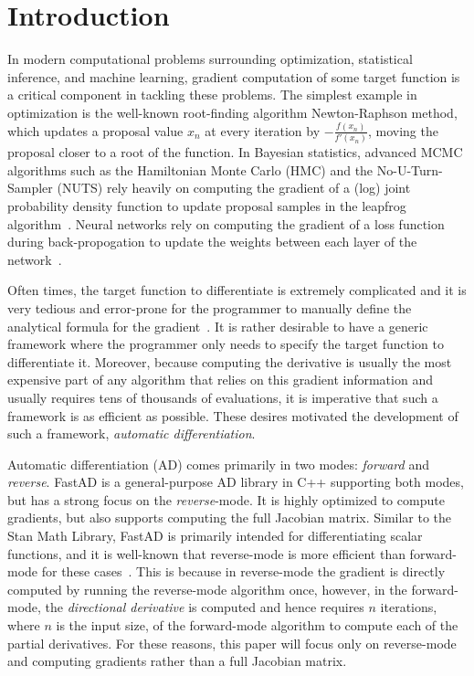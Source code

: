 \section{Introduction}

In modern computational problems surrounding optimization, statistical inference, and machine learning,
gradient computation of some target function is a critical component in tackling these problems.
The simplest example in optimization is the well-known root-finding algorithm Newton-Raphson method,
which updates a proposal value $x_n$ at every iteration by $-\frac{f(x_n)}{f'(x_n)}$,
moving the proposal closer to a root of the function.
In Bayesian statistics, advanced MCMC algorithms
such as the Hamiltonian Monte Carlo (HMC) and the No-U-Turn-Sampler (NUTS) rely
heavily on computing the gradient of a (log) joint probability density function
to update proposal samples in the leapfrog algorithm~\cite{hoffman:2011}\cite{neal:2012}.
Neural networks rely on computing 
the gradient of a loss function during back-propogation
to update the weights between each layer of the network~\cite{goodfellow:2016}.

Often times, the target function to differentiate is extremely complicated
and it is very tedious and error-prone for the programmer to manually define 
the analytical formula for the gradient~\cite{margossian:2018}.
It is rather desirable to have a generic framework where the programmer 
only needs to specify the target function to differentiate it.
Moreover, because computing the derivative is usually the most expensive part of any algorithm
that relies on this gradient information and usually requires tens of thousands of evaluations, 
it is imperative that such a framework is as efficient as possible.
These desires motivated the development of such a framework, \emph{automatic differentiation}.

Automatic differentiation (AD) comes primarily in two modes: \emph{forward} and \emph{reverse}.
FastAD is a general-purpose AD library in C++ supporting both modes, but has a strong focus on the \emph{reverse}-mode.
It is highly optimized to compute gradients, but also supports computing the full Jacobian matrix.
Similar to the Stan Math Library, FastAD is primarily intended for differentiating scalar functions, 
and it is well-known that reverse-mode is more efficient than forward-mode for these cases~\cite{carpenter:2015}.
This is because in reverse-mode the gradient is directly computed by running the reverse-mode algorithm once,
however, in the forward-mode, the \emph{directional derivative} is computed and hence requires 
$n$ iterations, where $n$ is the input size, of the forward-mode algorithm to compute each of the partial derivatives.
For these reasons, this paper will focus only on reverse-mode and computing gradients rather than a full Jacobian matrix.
